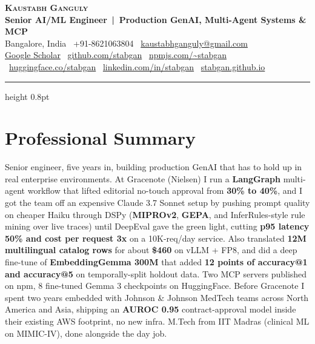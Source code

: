 \documentclass[letterpaper,11pt]{article}
\begin{document}
\begin{flushleft}
  \textbf{\Huge \scshape \color{accent}Kaustabh Ganguly}\\[0.25em]
  \normalsize \textbf{Senior AI/ML Engineer \,|\, Production GenAI, Multi-Agent Systems \& MCP}\\[0.3em]
  \small Bangalore, India \textbar\ +91-8621063804 \textbar\ \href{mailto:kaustabhganguly@gmail.com}{kaustabhganguly@gmail.com}\\[0.15em]
  \footnotesize \href{https://scholar.google.com/citations?user=3AG6T5QAAAAJ}{Google Scholar} \textbar\ \href{https://github.com/stabgan}{github.com/stabgan} \textbar\ \href{https://www.npmjs.com/~stabgan}{npmjs.com/\textasciitilde stabgan} \textbar\ \href{https://huggingface.co/stabgan}{huggingface.co/stabgan} \textbar\ \href{https://linkedin.com/in/stabgan}{linkedin.com/in/stabgan} \textbar\ \href{https://stabgan.github.io}{stabgan.github.io}
\end{flushleft}
\vspace{-2pt}
{\color{accent}\hrule height 0.8pt}
\vspace{-4pt}

\section{Professional Summary}
\small
Senior engineer, five years in, building production GenAI that has to hold up in real enterprise environments. At Gracenote (Nielsen) I run a \textbf{LangGraph} multi-agent workflow that lifted editorial no-touch approval from \textbf{30\% to 40\%}, and I got the team off an expensive Claude 3.7 Sonnet setup by pushing prompt quality on cheaper Haiku through DSPy (\textbf{MIPROv2}, \textbf{GEPA}, and InferRules-style rule mining over live traces) until DeepEval gave the green light, cutting \textbf{p95 latency 50\% and cost per request 3x} on a 10K-req/day service. Also translated \textbf{12M multilingual catalog rows} for about \textbf{\$460} on vLLM + FP8, and did a deep fine-tune of \textbf{EmbeddingGemma 300M} that added \textbf{12 points of accuracy@1 and accuracy@5} on temporally-split holdout data. Two MCP servers published on npm, 8 fine-tuned Gemma 3 checkpoints on HuggingFace. Before Gracenote I spent two years embedded with Johnson \& Johnson MedTech teams across North America and Asia, shipping an \textbf{AUROC 0.95} contract-approval model inside their existing AWS footprint, no new infra. M.Tech from IIT Madras (clinical ML on MIMIC-IV), done alongside the day job.
\end{document}
